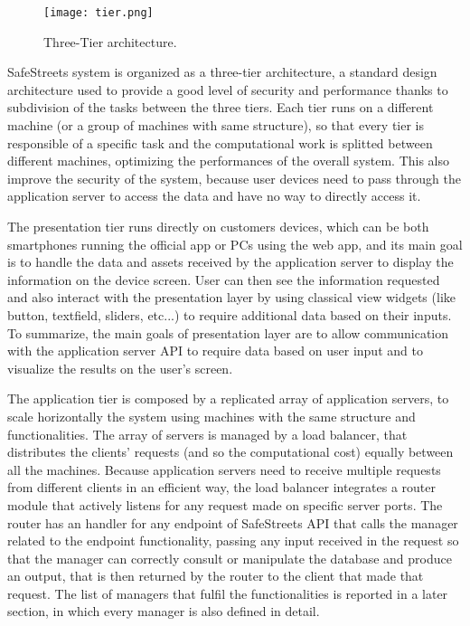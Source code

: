 \begin{figure}[H]
	\centering
	\texttt{[image: tier.png]}
	\caption{Three-Tier architecture.}
\end{figure}

SafeStreets system is organized as a three-tier architecture, a standard design architecture used to provide a good level of security and performance thanks to subdivision of the tasks between the three tiers. Each tier runs on a different machine (or a group of machines with same structure), so that every tier is responsible of a specific task and the computational work is splitted between different machines, optimizing the performances of the overall system. This also improve the security of the system, because user devices need to pass through the application server to access the data and have no way to directly access it. 

The presentation tier runs directly on customers devices, which can be both smartphones running the official app or PCs using the web app, and its main goal is to handle the data and assets received by the application server to display the information on the device screen. User can then see the information requested and also interact with the presentation layer by using classical view widgets (like button, textfield, sliders, etc...) to require additional data based on their inputs. To summarize, the main goals of presentation layer are to allow communication with the application server API to require data based on user input and to visualize the results on the user's screen.

The application tier is composed by a replicated array of application servers, to scale horizontally the system using machines with the same structure and functionalities. The array of servers is managed by a load balancer, that distributes the clients' requests (and so the computational cost) equally between all the machines. Because application servers need to receive multiple requests from different clients in an efficient way, the load balancer integrates a router module that actively listens for any request made on specific server ports. The router has an handler for any endpoint of SafeStreets API that calls the manager related to the endpoint functionality, passing any input received in the request so that the manager can correctly consult or manipulate the database and produce an output, that is then returned by the router to the client that made that request. The list of managers that fulfil the functionalities is reported in a later section, in which every manager is also defined in detail.

